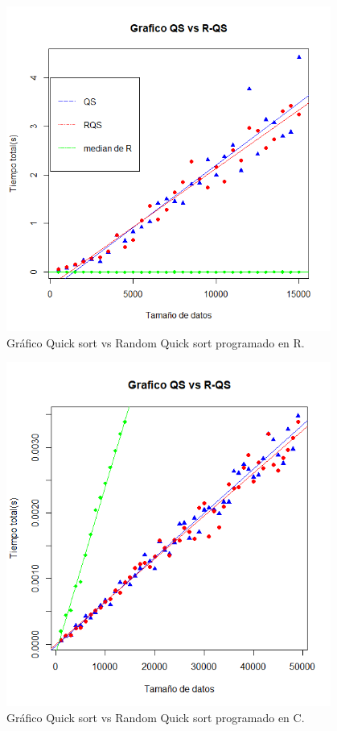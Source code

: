 \documentclass[final]{beamer}
\newlength{\sepmargin}
\newlength{\onecolwid}
\begin{document}
\begin{frame}[t]
\begin{columns}[t]
\begin{column}{\onecolwid}
			\begin{figure}
				\centering
				\includegraphics[width=.73\linewidth]{Rplot.png}
				\caption{Gráfico Quick sort vs Random Quick sort programado en R.}
			\end{figure}
			\vspace{-1.5cm}
			\begin{figure}
				\centering
				\includegraphics[width=.73\linewidth]{Cplot.png}
				\caption{Gráfico Quick sort vs Random Quick sort programado en C.}
			\end{figure}
			\vspace{-0.9cm}
		\end{column}

		\begin{column}{\sepmargin} \end{column}
	\end{columns} 


\end{frame}
\end{document}
